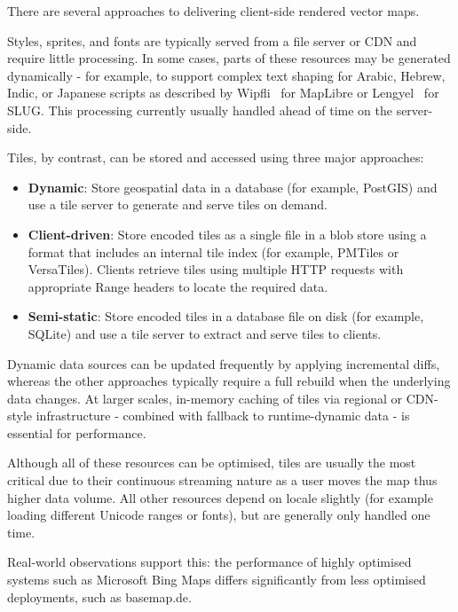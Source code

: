 There are several approaches to delivering client-side rendered vector maps.

Styles, sprites, and fonts are typically served from a file server or \ac{CDN} and require little processing.
In some cases, parts of these resources may be generated dynamically - for example, to support complex text shaping for Arabic, Hebrew, Indic, or Japanese scripts as described by Wipfli~\cite{wipfliComplexTextPlugin2025} for MapLibre or Lengyel~\cite{lengelDecadeSlug} for SLUG.
This processing currently usually handled ahead of time on the server-side.

Tiles, by contrast, can be stored and accessed using three major approaches:

\begin{itemize}
\item
    \textbf{Dynamic}:
    Store geospatial data in a database (for example, PostGIS) and use a tile server to generate and serve tiles on demand.
\item
    \textbf{Client-driven}:
    Store encoded tiles as a single file in a blob store using a format that includes an internal tile index (for example, PMTiles or VersaTiles).
    Clients retrieve tiles using multiple HTTP requests with appropriate Range headers to locate the required data.
\item
    \textbf{Semi-static}:
    Store encoded tiles in a database file on disk (for example, SQLite) and use a tile server to extract and serve tiles to clients.
\end{itemize}

Dynamic data sources can be updated frequently by applying incremental diffs, whereas the other approaches typically require a full rebuild when the underlying data changes.
At larger scales, in-memory caching of tiles via regional or \ac{CDN}-style infrastructure - combined with fallback to runtime-dynamic data - is essential for performance.

Although all of these resources can be optimised, tiles are usually the most critical due to their continuous streaming nature as a user moves the map thus higher data volume.
All other resources depend on locale slightly (for example loading different Unicode ranges or fonts), but are generally only handled one time.

Real-world observations support this:
the performance of highly optimised systems such as Microsoft Bing Maps differs significantly from less optimised deployments, such as basemap.de.

